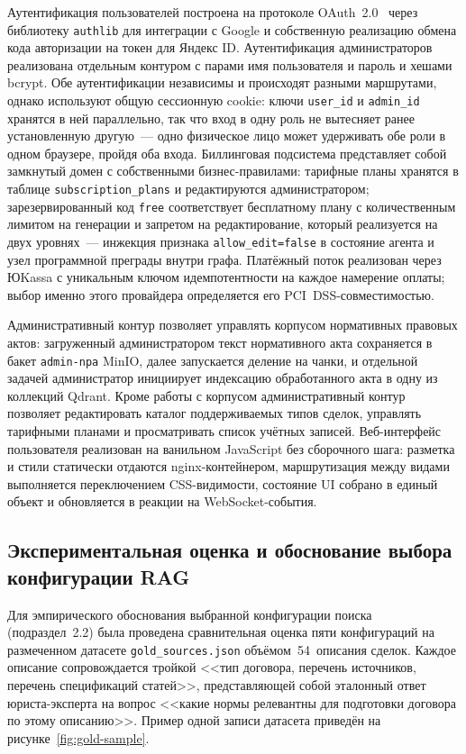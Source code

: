 Аутентификация пользователей построена на протоколе OAuth~2.0~\cite{rfc6749} через библиотеку \texttt{authlib} для интеграции с Google и собственную реализацию обмена кода авторизации на токен для Яндекс ID. Аутентификация администраторов реализована отдельным контуром с парами имя пользователя и пароль и хешами bcrypt. Обе аутентификации независимы и происходят разными маршрутами, однако используют общую сессионную cookie: ключи \texttt{user\_id} и \texttt{admin\_id} хранятся в ней параллельно, так что вход в одну роль не вытесняет ранее установленную другую~--- одно физическое лицо может удерживать обе роли в одном браузере, пройдя оба входа. Биллинговая подсистема представляет собой замкнутый домен с собственными бизнес-правилами: тарифные планы хранятся в таблице \texttt{subscription\_plans} и редактируются администратором; зарезервированный код \texttt{free} соответствует бесплатному плану с количественным лимитом на генерации и запретом на редактирование, который реализуется на двух уровнях~--- инжекция признака \texttt{allow\_edit=false} в состояние агента и узел программной преграды внутри графа. Платёжный поток реализован через ЮKassa с уникальным ключом идемпотентности на каждое намерение оплаты; выбор именно этого провайдера определяется его PCI~DSS-совместимостью.

Административный контур позволяет управлять корпусом нормативных правовых актов: загруженный администратором текст нормативного акта сохраняется в бакет \texttt{admin-npa} MinIO, далее запускается деление на чанки, и отдельной задачей администратор инициирует индексацию обработанного акта в одну из коллекций Qdrant. Кроме работы с корпусом административный контур позволяет редактировать каталог поддерживаемых типов сделок, управлять тарифными планами и просматривать список учётных записей. Веб-интерфейс пользователя реализован на ванильном JavaScript без сборочного шага: разметка и стили статически отдаются nginx-контейнером, маршрутизация между видами выполняется переключением CSS-видимости, состояние UI собрано в единый объект и обновляется в реакции на WebSocket-события.

\subsection{Экспериментальная оценка и обоснование выбора конфигурации RAG}

Для эмпирического обоснования выбранной конфигурации поиска (подраздел~2.2) была проведена сравнительная оценка пяти конфигураций на размеченном датасете \texttt{gold\_sources.json} объёмом~54~описания сделок. Каждое описание сопровождается тройкой <<тип договора, перечень источников, перечень спецификаций статей>>, представляющей собой эталонный ответ юриста-эксперта на вопрос <<какие нормы релевантны для подготовки договора по этому описанию>>. Пример одной записи датасета приведён на рисунке~\ref{fig:gold-sample}.

